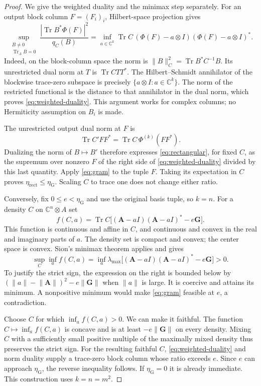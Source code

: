 \documentclass[11pt]{article}
\numberwithin{equation}{section}
\theoremstyle{definition}
\theoremstyle{remark}
\DeclareMathOperator{\Tr}{Tr}
\newcommand{\norm}[1]{\lVert #1\rVert}
\begin{document}
\begin{proof}
We give the weighted duality and the minimax step separately. For an output
block column $F=(F_i)_i$, Hilbert-space projection gives
\begin{equation}
 \sup_{\substack{B\ne0\\ \Tr_A B=0}}
 \frac{|\Tr B^*\Phi(F)|^2}{q_C(B)}
 =
 \inf_{a\in\mathbb C^k}
 \Tr C\,(\Phi(F)-a\otimes I)(\Phi(F)-a\otimes I)^* .
 \label{eq:weighted-duality}
\end{equation}
Indeed, on the block-column space the norm is
$\norm B_C^2=\Tr B^*C^{-1}B$. Its unrestricted dual norm at $T$ is
$\Tr CTT^*$. The Hilbert--Schmidt annihilator of the blockwise trace-zero
subspace is precisely $\{a\otimes I:a\in\mathbb C^k\}$. The norm of the
restricted functional is the distance to that annihilator in the dual norm,
which proves \eqref{eq:weighted-duality}. This argument works for complex
columns; no Hermiticity assumption on $B_i$ is made.

The unrestricted output dual norm at $F$ is
\[
 \Tr C'FF^*=\Tr C\,\Phi^{(k)}(FF^*).
\]
Dualizing the norm of $B\mapsto B'$ therefore expresses
\eqref{eq:rectangular}, for fixed $C$, as the supremum over nonzero $F$ of
the right side of \eqref{eq:weighted-duality} divided by this last quantity.
Apply \eqref{eq:gram} to the tuple $F$. Taking its expectation in $C$ proves
$\eta_{\mathrm{rect}}\leq\eta_{\mathrm G}$. Scaling $C$ to trace one
does not change either ratio.

Conversely, fix $0\leq e<\eta_{\mathrm G}$ and use the original basis tuple,
so $k=n$. For a density $C$ on $\mathbb C^n\otimes A$ set
\[
 f(C,a)=\Tr C\big[
    (\mathbf A-aI)(\mathbf A-aI)^*-e\mathbf G\big].
\]
This function is continuous and affine in $C$, and continuous and convex in
the real and imaginary parts of $a$. The density set is compact and convex;
the center space is convex. Sion's minimax theorem
\cite[Theorem~4.2]{Sion58} applies and gives
\begin{equation}
 \sup_C\inf_a f(C,a)
 =\inf_a\lambda_{\max}
    \big[(\mathbf A-aI)(\mathbf A-aI)^*-e\mathbf G\big]>0.
 \label{eq:gram-minimax}
\end{equation}
To justify the strict sign, the expression on the right is bounded below by
$(\norm a-\norm{\mathbf A})^2-e\norm{\mathbf G}$ when $\norm a$
is large. It is coercive and attains its minimum. A nonpositive minimum
would make \eqref{eq:gram} feasible at $e$, a contradiction.

Choose $C$ for which $\inf_a f(C,a)>0$. We can make it faithful.
The function $C\mapsto\inf_a f(C,a)$ is concave and is at least
$-e\norm{\mathbf G}$ on every density. Mixing $C$ with a sufficiently
small positive multiple of the maximally mixed density thus preserves the
strict sign. For the resulting faithful $C$, \eqref{eq:weighted-duality}
and norm duality supply a trace-zero block column whose ratio exceeds $e$.
Since $e$ can approach $\eta_{\mathrm G}$, the reverse inequality follows.
If $\eta_{\mathrm G}=0$ it is already immediate. This construction uses
$k=n=m^2$.
\end{proof}
\end{document}
